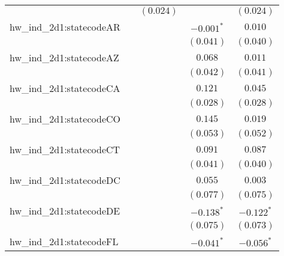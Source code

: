 \begin{center}
\begin{longtable}{l c c c c}
                         &                       & $(0.024)$             &                       & $(0.024)$             \\
hw\_ind\_2d1:statecodeAR &                       &                       & $\mathbf{-0.001}^{*}$ & $0.010$               \\
                         &                       &                       & $(0.041)$             & $(0.040)$             \\
hw\_ind\_2d1:statecodeAZ &                       &                       & $0.068$               & $0.011$               \\
                         &                       &                       & $(0.042)$             & $(0.041)$             \\
hw\_ind\_2d1:statecodeCA &                       &                       & $0.121$               & $0.045$               \\
                         &                       &                       & $(0.028)$             & $(0.028)$             \\
hw\_ind\_2d1:statecodeCO &                       &                       & $0.145$               & $0.019$               \\
                         &                       &                       & $(0.053)$             & $(0.052)$             \\
hw\_ind\_2d1:statecodeCT &                       &                       & $0.091$               & $0.087$               \\
                         &                       &                       & $(0.041)$             & $(0.040)$             \\
hw\_ind\_2d1:statecodeDC &                       &                       & $0.055$               & $0.003$               \\
                         &                       &                       & $(0.077)$             & $(0.075)$             \\
hw\_ind\_2d1:statecodeDE &                       &                       & $\mathbf{-0.138}^{*}$ & $\mathbf{-0.122}^{*}$ \\
                         &                       &                       & $(0.075)$             & $(0.073)$             \\
hw\_ind\_2d1:statecodeFL &                       &                       & $\mathbf{-0.041}^{*}$ & $\mathbf{-0.056}^{*}$ \\

\end{longtable}
\end{center}
